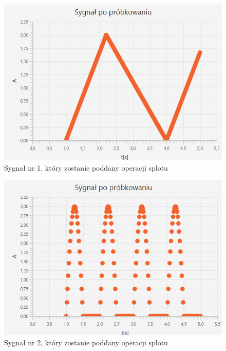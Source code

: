 \documentclass[12pt]{article}
\begin{document}
\begin{figure}[H]
    \centering
	\includegraphics[width=\linewidth]{sygnal_po_probkowaniu_2.2.png}
    \caption{Sygnał nr 1, który zostanie poddany operacji splotu}
    \label{Sygnał_3.1}
\end{figure}

\begin{figure}[H]
    \centering
	\includegraphics[width=\linewidth]{sygnal_po_probkowaniu_2.1.png}
    \caption{Sygnał nr 2, który zostanie poddany operacji splotu}
    \label{Sygnał_3.2}
\end{figure}
\end{document}
